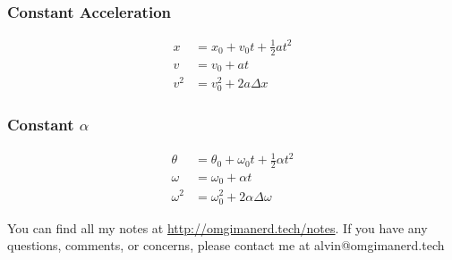 \documentclass{math}
\begin{document}
\subsubsection*{Constant Acceleration}
\begin{align*}
  x &= x_0+v_0t+\frac{1}{2}at^2 \\
  v &= v_0+at \\
  v^2 &= v_0^2+2a\Delta x
\end{align*}

\subsubsection*{Constant \( \alpha \)}
\begin{align*}
  \theta &= \theta_0+\omega_0t+\frac{1}{2}\alpha t^2 \\
  \omega &= \omega_0+\alpha t \\
  \omega^2 &= \omega_0^2+2\alpha\Delta\omega
\end{align*}

\begin{center}
  You can find all my notes at \url{http://omgimanerd.tech/notes}. If you have
  any questions, comments, or concerns, please contact me at
  alvin@omgimanerd.tech
\end{center}
\end{document}

